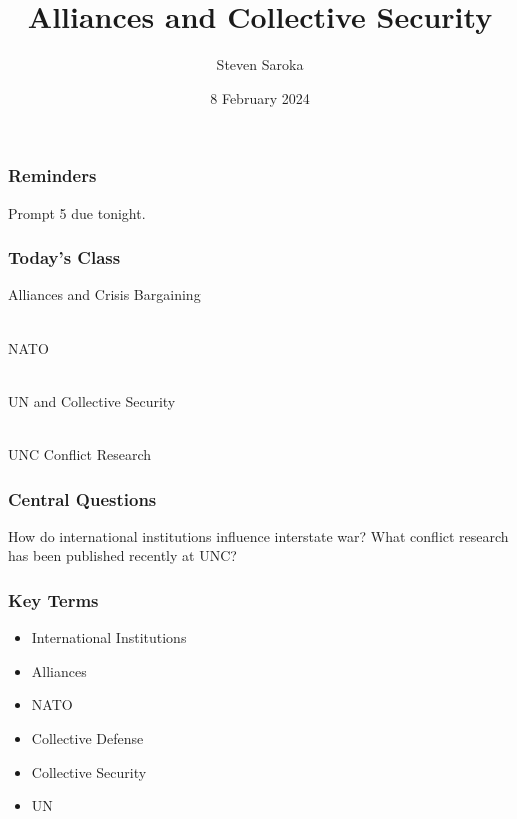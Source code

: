 \documentclass[handout]{beamer}
\title[Alliances and Collective Security]{\LARGE{Alliances and Collective Security}}
\author[POLI 150]{Steven Saroka}
\institute{POLI 150}
\date{8 February 2024}
\begin{document}
\begin{frame}
\titlepage %
\end{frame}




\begin{frame} 
	\frametitle{\LARGE{Reminders}}
	\begin{itemize}
		\Large{
			\item Prompt 5 due tonight.

		}
	\end{itemize}
\end{frame}

\begin{frame} 
	\frametitle{\LARGE{Today's Class}}
	\begin{itemize}
		\Large{
			\item Alliances and Crisis Bargaining
			\\~\\ 
			\item NATO
			\\~\\
			\item UN and Collective Security
			\\~\\
			\item UNC Conflict Research
		}
	\end{itemize}
\end{frame}

\begin{frame} 
	\frametitle{\LARGE{Central Questions}}
	\centering
	\Large{How do international institutions influence interstate war? What conflict research has been published recently at UNC?}
\end{frame}

\begin{frame} 
	\frametitle{\LARGE{Key Terms}}
	\begin{itemize}
		\item International Institutions
		\item Alliances 
		\item NATO
		\item Collective Defense
		\item Collective Security
		\item UN
	\end{itemize}
\end{frame}
\end{document}
